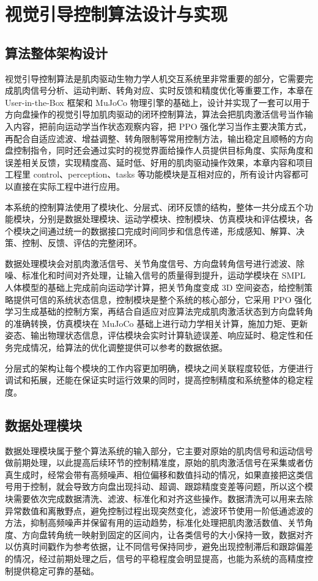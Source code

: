
\chapter{视觉引导控制算法设计与实现}
\section{算法整体架构设计}
视觉引导控制算法是肌肉驱动生物力学人机交互系统里非常重要的部分，它需要完成肌肉信号分析、运动判断、转角对应、实时反馈和精度优化等重要工作，本章在 User-in-the-Box 框架和 MuJoCo 物理引擎的基础上，设计并实现了一套可以用于方向盘操作的视觉引导加肌肉驱动的闭环控制算法，算法会把肌肉激活信号当作输入内容，把前向运动学当作状态观察内容，把 PPO 强化学习当作主要决策方式，再配合自适应滤波、增益调整、转角限制等常用控制方法，输出稳定且顺畅的方向盘控制指令，同时还会通过实时的视觉界面给操作人员提供目标角度、实际角度和误差相关反馈，实现精度高、延时低、好用的肌肉驱动操作效果，本章内容和项目工程里 control、perception、tasks 等功能模块是互相对应的，所有设计内容都可以直接在实际工程中进行应用。

本系统的控制算法使用了模块化、分层式、闭环反馈的结构，整体一共分成五个功能模块，分别是数据处理模块、运动学模块、控制模块、仿真模块和评估模块，各个模块之间通过统一的数据接口完成时间同步和信息传递，形成感知、解算、决策、控制、反馈、评估的完整闭环。

数据处理模块会对肌肉激活信号、关节角度信号、方向盘转角信号进行滤波、除噪、标准化和时间对齐处理，让输入信号的质量得到提升，运动学模块在 SMPL 人体模型的基础上完成前向运动学计算，把关节角度变成 3D 空间姿态，给控制策略提供可信的系统状态信息，控制模块是整个系统的核心部分，它采用 PPO 强化学习生成基础的控制方案，再结合自适应对应算法完成肌肉激活状态到方向盘转角的准确转换，仿真模块在 MuJoCo 基础上进行动力学相关计算，施加力矩、更新姿态、输出物理状态信息，评估模块会实时计算轨迹误差、响应延时、稳定性和任务完成情况，给算法的优化调整提供可以参考的数据依据\cite{lv2025jiyu}。

分层式的架构让每个模块的工作内容更加明确，模块之间关联程度较低，方便进行调试和拓展，还能在保证实时运行效果的同时，提高控制精度和系统整体的稳定程度。
\section{数据处理模块}
数据处理模块属于整个算法系统的输入部分，它主要对原始的肌肉信号和运动信号做前期处理，以此提高后续环节的控制精准度，原始的肌肉激活信号在采集或者仿真生成时，经常会带有高频噪声、相位偏移和数值抖动的情况，如果直接把这类信号用于控制，就会导致方向盘出现抖动、超调、跟踪精度变差等问题，所以这个模块需要依次完成数据清洗、滤波、标准化和对齐这些操作。数据清洗可以用来去除异常数值和离散野点，避免控制过程出现突然变化，滤波环节使用一阶低通滤波的方法，抑制高频噪声并保留有用的运动趋势，标准化处理把肌肉激活数值、关节角度、方向盘转角统一映射到固定的区间内，让各类信号的大小保持一致，数据对齐以仿真时间戳作为参考依据，让不同信号保持同步，避免出现控制滞后和跟踪偏差的情况，经过前期处理之后，信号的平稳程度会明显提高，也能为系统的高精度控制提供稳定可靠的基础。
